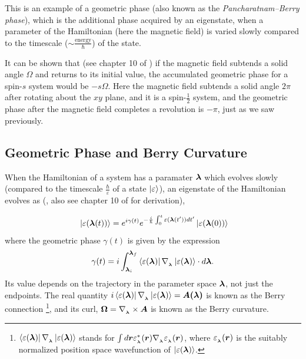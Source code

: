 \documentclass{report}
\renewcommand\vec[1]{\ensuremath\boldsymbol{#1}} %
\begin{document}
This is an example of a geometric phase (also known as the \textit{Pancharatnam–Berry phase}), which is the additional phase acquired by an eigenstate, when a parameter of the Hamiltonian (here the magnetic field) is varied slowly compared to the timescale ($\sim \frac{\text{energy}}{\hbar}$) of the state.

It can be shown that (see chapter 10 of \cite{book:Griffiths2004IntroductiontoQM}) if the magnetic field subtends a solid angle $\Omega$ and returns to its initial value, the accumulated geometric phase for a spin-$s$ system would be $-s{\Omega}$. Here the magnetic field subtends a solid angle $2 \pi$ after rotating about the $xy$ plane, and it is a spin-$\frac{1}{2}$ system, and the geometric phase after the magnetic field completes a revolution is $-\pi$, just as we saw previously.


\subsection{Geometric Phase and Berry Curvature}
When the Hamiltonian of a system has a paramater $\vec{\lambda}$ which evolves slowly (compared to the timescale $\frac{\hbar}{\varepsilon}$ of a state $\ket{\varepsilon}$), an eigenstate of the Hamiltonian evolves as (\cite{BerryQuantalPhase1984}, also see chapter 10 of  \cite{book:Griffiths2004IntroductiontoQM} for derivation),

\begin{equation}~\label{Eq:BerryPhaseOriginal}
	\ket{\varepsilon(\vec{\lambda}(t))} = e^{i \gamma(t)} e^{-\frac{i}{\hbar} \int_0^t \varepsilon(\vec{\lambda}(t')) dt'} \ket{\varepsilon(\vec{\lambda}(0))}
\end{equation}
where the geometric phase $\gamma(t)$ is given by the expression $$\gamma(t) = i\int_{\vec{\lambda}_i}^{\vec{\lambda}_f} \bra{\varepsilon({\vec{\lambda}})}\nabla_{_{\vec{\lambda}}} \ket{\varepsilon({\vec{\lambda}})} \cdot d \vec{\lambda}.$$ Its value depends on the trajectory in the parameter space $\vec{\lambda}$, not just the endpoints. The real quantity $i\bra{\varepsilon({\vec{\lambda}})}\nabla_{_{\vec{\lambda}}}\ket{\varepsilon({\vec{\lambda}})} = \vec{A(\vec{\lambda})}$ is known as the Berry connection  \footnote{$\bra{\varepsilon({\vec{\lambda}})}\nabla_{_{\vec{\lambda}}} \ket{\varepsilon({\vec{\lambda}})}$ stands for $\int d\vec{r} \varepsilon_{_{\vec{\lambda}}}^* (\vec{r}) \nabla_{_{\vec{\lambda}}} \varepsilon_{_{\vec{\lambda}}}(\vec{r})$, where $\varepsilon_{_{\vec{\lambda}}}(\vec{r})$ is the suitably normalized position space wavefunction of $\ket{\varepsilon({\vec{\lambda}})}$.}, and its curl, $\vec{\Omega} = \nabla_{_{\vec{\lambda}}} \times \vec{A}$ is known as the Berry curvature.
\end{document}
